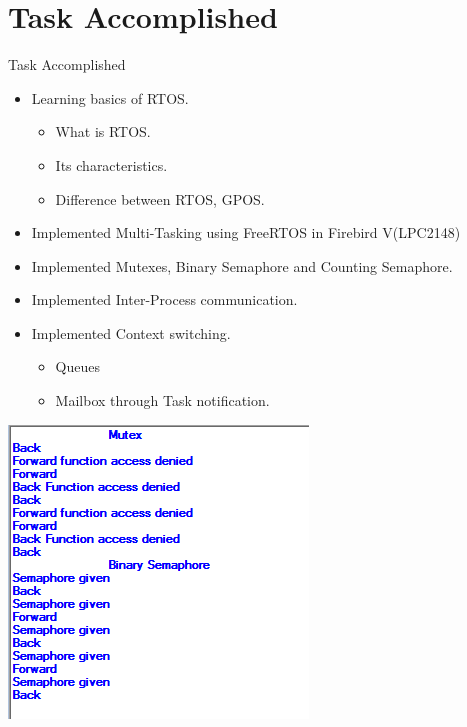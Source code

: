\documentclass[10pt, a4paper]{beamer}
\begin{document}
\section{Task Accomplished}
\begin{frame}{Task Accomplished}
    \begin{itemize}
        \item Learning basics of RTOS.
            \begin{itemize}
            \item What is RTOS.
            \item Its characteristics.
            \item Difference between RTOS, GPOS.
            \end{itemize}
        \item Implemented Multi-Tasking using FreeRTOS in Firebird V(LPC2148)
        \item Implemented Mutexes, Binary Semaphore and Counting Semaphore.
         \item Implemented Inter-Process communication.
        \item Implemented Context switching. 
        \begin{itemize}
        \item  Queues
        \item  Mailbox through Task notification.
        \end{itemize}
    \end{itemize}
\end{frame}

\begin{frame}
\includegraphics{Binarymutex}
\end{frame}
\end{document}
